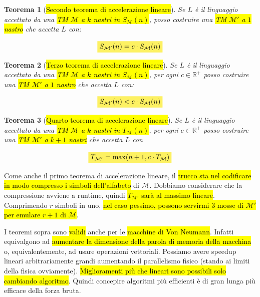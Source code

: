 \documentclass[a4paper,11pt,oneside]{article}
\theoremstyle{plain}
\newtheorem{thm}{Teorema}[section]
\theoremstyle{definition}
\theoremstyle{remark}
\newcommand{\mhl}[1]{\colorbox{hlcolor}{$\displaystyle #1$}}
\begin{document}
\begin{thm}[\hl{Secondo teorema di accelerazione lineare}]\label{thm:acc-lin-2}
  Se $L$ è il linguaggio accettato da una \hl{TM $\mathcal{M}$ a $k$ nastri in
  $S_\mathcal{M}(n)$}, posso costruire una \hl{TM $\mathcal{M}'$ a $1$ nastro}
  che accetta $L$ con:

  \begin{equation}
    \mhl{ S_{\mathcal{M}'}(n) = c \cdot S_\mathcal{M}(n) }
  \end{equation}
\end{thm}

\begin{thm}[\hl{Terzo teorema di accelerazione lineare}]\label{thm:acc-lin-3}
  Se $L$ è il linguaggio accettato da una \hl{TM $\mathcal{M}$ a $k$ nastri in
  $S_\mathcal{M}(n)$}, per ogni $c \in \mathbb{R}^+$ posso costruire una \hl{TM
  $\mathcal{M}'$ a $1$ nastro} che accetta $L$ con:

  \begin{equation}
    \mhl{ S_{\mathcal{M}'}(n) < c \cdot S_\mathcal{M}(n) }
  \end{equation}
\end{thm}

\begin{thm}[\hl{Quarto teorema di accelerazione lineare}]\label{thm:acc-lin-4}
  Se $L$ è il linguaggio accettato da una \hl{TM $\mathcal{M}$ a $k$ nastri in
  $T_\mathcal{M}(n)$}, per ogni $c \in \mathbb{R}^+$ posso costruire una \hl{TM
  $\mathcal{M}'$ a $k+1$ nastri} che accetta $L$ con

  \begin{equation}
    \mhl{ T_{\mathcal{M}'} = \max(n+1, c\cdot T_\mathcal{M}) }
  \end{equation}
\end{thm}

Come anche il primo teorema di accelerazione lineare, il \hl{trucco sta nel
codificare in modo compresso i simboli dell'alfabeto} di $\mathcal{M}$. Dobbiamo
considerare che la compressione avviene a runtime, quindi \hl{$T_{\mathcal{M}'}$
sarà al massimo lineare}. Comprimendo $r$ simboli in uno, \hl{nel caso pessimo,
possono servirmi 3 mosse di $\mathcal{M}'$ per emulare $r+1$ di $\mathcal{M}$}.

I teoremi sopra sono \hl{validi} anche per le \hl{macchine di Von Neumann}.
Infatti equivalgono ad \hl{aumentare la dimensione della parola di memoria della
macchina} o, equivalentemente, ad usare operazioni vettoriali. Possiamo avere
speedup lineari arbitrariamente grandi aumentando il parallelismo fisico (stando
ai limiti della fisica ovviamente). \hl{Miglioramenti più che lineari sono
possibili solo cambiando algoritmo}. Quindi concepire algoritmi più efficienti è
di gran lunga più efficace della forza bruta.
\end{document}
